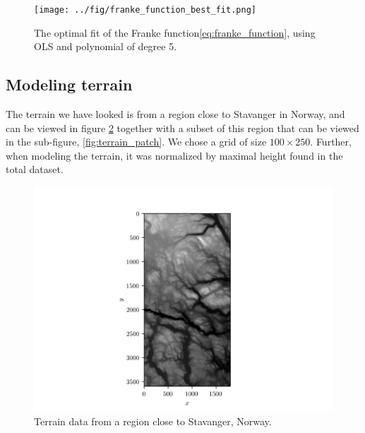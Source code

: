 \documentclass[11pt]{article}
\begin{document}
\begin{figure}[H]
    \centering
    \texttt{[image: ../fig/franke\_function\_best\_fit.png]}
    \caption{The optimal fit of the Franke function\eqref{eq:franke_function}, using OLS and polynomial of degree 5.}
    \label{fig:optimal_fit_franke_func}
\end{figure}



\subsection{Modeling terrain}
The terrain we have looked is from a region close to Stavanger in Norway, and can be viewed in figure \ref{fig:terrain_map_full} together with a subset of this region that can be viewed in the sub-figure, \ref{fig:terrain_patch}. We chose a grid of size $100 \times 250$. Further, when modeling the terrain, it was normalized by maximal height found in the total dataset.

\begin{figure}[H]
    \centering
    \includegraphics[scale=1.0]{../fig/terrain_data.png}
    \caption{Terrain data from a region close to Stavanger, Norway.}
    \label{fig:terrain_map_full}
\end{figure}
\end{document}
